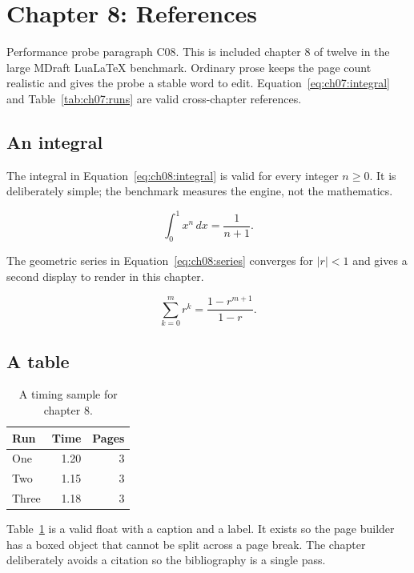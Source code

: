 \section{Chapter 8: References}
\label{sec:ch08}

Performance probe paragraph C08. This is included chapter 8 of twelve in
the large MDraft LuaLaTeX benchmark. Ordinary prose keeps the page count
realistic and gives the probe a stable word to edit. Equation~\ref{eq:ch07:integral} and
Table~\ref{tab:ch07:runs} are valid cross-chapter references.

\subsection{An integral}
The integral in Equation~\ref{eq:ch08:integral} is valid for every integer
$n \ge 0$. It is deliberately simple; the benchmark measures the engine, not
the mathematics.

\begin{equation}
  \label{eq:ch08:integral}
  \int_{0}^{1} x^{n}\,dx = \frac{1}{n+1}.
\end{equation}

The geometric series in Equation~\ref{eq:ch08:series} converges for
$|r| < 1$ and gives a second display to render in this chapter.

\begin{equation}
  \label{eq:ch08:series}
  \sum_{k=0}^{m} r^{k} = \frac{1-r^{m+1}}{1-r}.
\end{equation}

\subsection{A table}
\begin{table}[h]
  \centering
  \begin{tabular}{lrr}
    \toprule
    Run & Time & Pages \\
    \midrule
    One   & 1.20 & 3 \\
    Two   & 1.15 & 3 \\
    Three & 1.18 & 3 \\
    \bottomrule
  \end{tabular}
  \caption{A timing sample for chapter 8.}
  \label{tab:ch08:runs}
\end{table}

Table~\ref{tab:ch08:runs} is a valid float with a caption and a label. It
exists so the page builder has a boxed object that cannot be split across a
page break. The chapter deliberately avoids a citation so the bibliography is a single pass.

